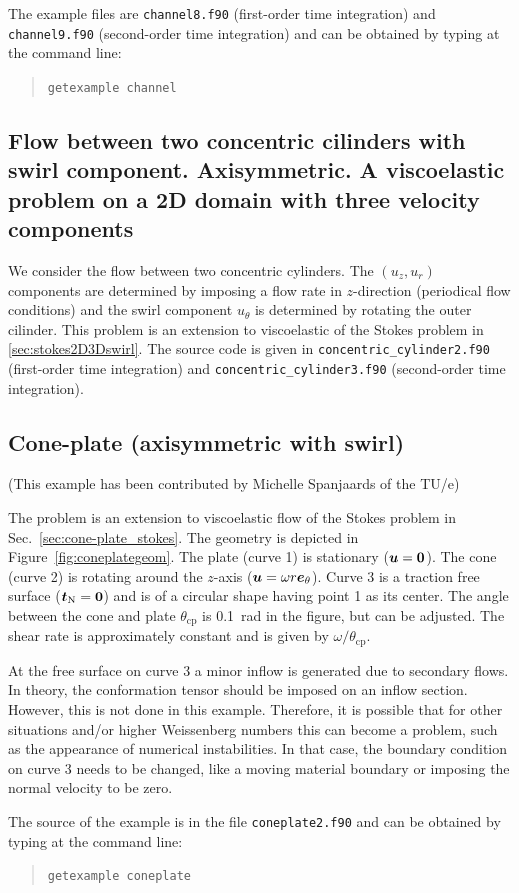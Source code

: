 The example files are \texttt{channel8.f90} (first-order time integration)
and \texttt{channel9.f90} (second-order time integration) and can be obtained by typing at the
command line:
\begin{quote}
   \texttt{getexample channel}
\end{quote}

\subsection{Flow between two concentric cilinders with swirl component. Axisymmetric. A viscoelastic problem on a 2D domain with three velocity components}            
\label{sec:viscoelastic2D3Dswirl}

We consider the flow between two concentric cylinders. The $(u_z,u_r)$ components
 are determined by imposing a flow rate in $z$-direction (periodical flow conditions) and the swirl component $u_\theta$ is determined by rotating the outer cilinder. 
This problem is an extension to viscoelastic of the Stokes problem in \ref{sec:stokes2D3Dswirl}.
The source code is given in \texttt{concentric\_cylinder2.f90} (first-order time integration) and \texttt{concentric\_cylinder3.f90} (second-order time integration).

\subsection{Cone-plate (axisymmetric with swirl)}
\label{sec:cone-plate_ve_se}

(This example has been contributed by Michelle Spanjaards of the TU/e)

The problem is an extension to viscoelastic flow of the Stokes problem in Sec.~\ref{sec:cone-plate_stokes}.
The geometry is depicted in Figure~\ref{fig:coneplategeom}. The plate (curve 1) is stationary ($\boldsymbol{u}=\boldsymbol{0}$). The cone (curve 2) is rotating around the $z$-axis ($\boldsymbol{u}=\omega r \boldsymbol{e}_\theta$). Curve 3 is a traction free surface ($\boldsymbol{t}_\text{N}=\boldsymbol{0}$) and is of a circular shape having point 1 as its center. The angle between the cone and plate $\theta_\text{cp}$ is 0.1~rad in the figure, but can be adjusted. The shear rate is approximately constant and is given by $\omega/\theta_\text{cp}$. 

At the free surface on curve 3 a minor inflow is generated due to secondary flows. In theory, the conformation tensor should be imposed on an inflow section. However, this is not done in this example. Therefore, it is possible that for other situations and/or higher Weissenberg numbers this can become a problem, such as the appearance of numerical instabilities. In that case, the boundary condition on curve 3 needs to be changed, like a moving material boundary or imposing the normal velocity to be zero.

The source of the example is in the file \texttt{coneplate2.f90}
and can be obtained by typing at the
command line:
\begin{quote}
   \texttt{getexample coneplate}
\end{quote}
